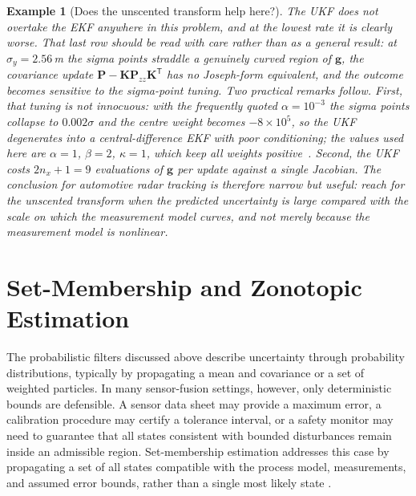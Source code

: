 \documentclass[11pt,oneside,openany]{book}
\newtheorem{example}{Example}[chapter]
\begin{document}
\begin{example}[Does the unscented transform help here?]
The UKF does not overtake the EKF anywhere in this problem, and at the lowest
rate it is clearly worse. That last row should be read with care rather than
as a general result: at $\sigma_y=2.56$\,m the sigma points straddle a genuinely
curved region of $\mathbf{g}$, the covariance update
$\mathbf{P}-\mathbf{K}\mathbf{P}_{zz}\mathbf{K}^{\mathsf T}$ has no Joseph-form
equivalent, and the outcome becomes sensitive to the sigma-point tuning. Two
practical remarks follow. First, that tuning is not innocuous: with the
frequently quoted $\alpha=10^{-3}$ the sigma points collapse to $0.002\sigma$
and the centre weight becomes $-8\times10^{5}$, so the UKF degenerates into a
central-difference EKF with poor conditioning; the values used here are
$\alpha=1$, $\beta=2$, $\kappa=1$, which keep all weights
positive~\cite{julier2004_ukf}. Second, the UKF costs $2n_x+1=9$ evaluations of
$\mathbf{g}$ per update against a single Jacobian. The conclusion for
automotive radar tracking is therefore narrow but useful: reach for the
unscented transform when the predicted uncertainty is large compared with the
scale on which the measurement model curves, and not merely because the
measurement model is nonlinear.
\end{example}



\color{black}



\section{Set-Membership and Zonotopic Estimation}

The probabilistic filters discussed above describe uncertainty through probability distributions, typically by propagating a mean and covariance or a set of weighted particles. In many sensor-fusion settings, however, only deterministic bounds are defensible. A sensor data sheet may provide a maximum error, a calibration procedure may certify a tolerance interval, or a safety monitor may need to guarantee that all states consistent with bounded disturbances remain inside an admissible region. Set-membership estimation addresses this case by propagating a set of all states compatible with the process model, measurements, and assumed error bounds, rather than a single most likely state \cite{alamo2005_zonotopes,rego2020_constrained_zonotopes}.
\end{document}
